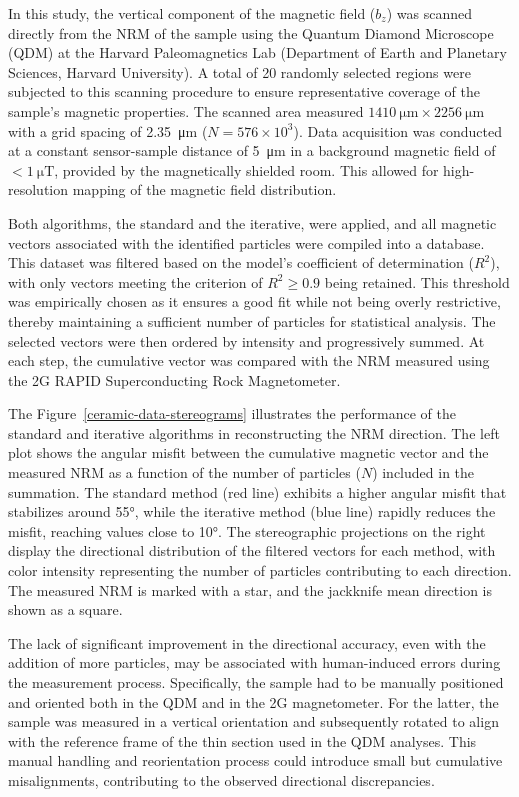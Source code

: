 In this study, the vertical component of the magnetic field ($b_z$) was scanned directly from the NRM of the sample using the Quantum Diamond Microscope (QDM) at the Harvard Paleomagnetics Lab (Department of Earth and Planetary Sciences, Harvard University). A total of 20 randomly selected regions were subjected to this scanning procedure to ensure representative coverage of the sample's magnetic properties. The scanned area measured $\qty{1410}{\um} \times \qty{2256}{\um}$ with a grid spacing of \qty{2.35}{\um} ($N = 576 \times 10^{3}$). Data acquisition was conducted at a constant sensor-sample distance of \qty{5}{\um} in a background magnetic field of $< \qty{1}{\micro\tesla}$, provided by the magnetically shielded room. This allowed for high-resolution mapping of the magnetic field distribution.

Both algorithms, the standard and the iterative, were applied, and all magnetic vectors associated with the identified particles were compiled into a database. This dataset was filtered based on the model's coefficient of determination ($R^2$), with only vectors meeting the criterion of $R^2 \geq 0.9$ being retained. This threshold was empirically chosen as it ensures a good fit while not being overly restrictive, thereby maintaining a sufficient number of particles for statistical analysis. The selected vectors were then ordered by intensity and progressively summed. At each step, the cumulative vector was compared with the NRM measured using the 2G RAPID Superconducting Rock Magnetometer.  

The Figure~\ref{ceramic-data-stereograms} illustrates the performance of the standard and iterative algorithms in reconstructing the NRM direction. The left plot shows the angular misfit between the cumulative magnetic vector and the measured NRM as a function of the number of particles ($N$) included in the summation. The standard method (red line) exhibits a higher angular misfit that stabilizes around \ang{55}, while the iterative method (blue line) rapidly reduces the misfit, reaching values close to \ang{10}. The stereographic projections on the right display the directional distribution of the filtered vectors for each method, with color intensity representing the number of particles contributing to each direction. The measured NRM is marked with a star, and the jackknife mean direction is shown as a square.

The lack of significant improvement in the directional accuracy, even with the addition of more particles, may be associated with human-induced errors during the measurement process. Specifically, the sample had to be manually positioned and oriented both in the QDM and in the 2G magnetometer. For the latter, the sample was measured in a vertical orientation and subsequently rotated to align with the reference frame of the thin section used in the QDM analyses. This manual handling and reorientation process could introduce small but cumulative misalignments, contributing to the observed directional discrepancies. 

